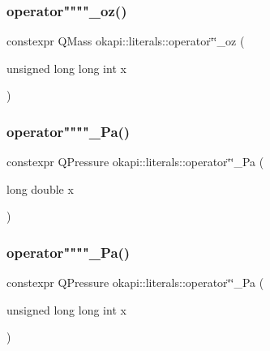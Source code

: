 \mbox{\label{namespaceokapi_1_1literals_a080ca78fe17f0bfe78e0a9c1c152aee9}} 
\subsubsection{\texorpdfstring{operator""""\_oz()}{operator""\_oz()}\hspace{0.1cm}{\footnotesize\ttfamily [2/2]}}
{\footnotesize\ttfamily constexpr Q\+Mass okapi\+::literals\+::operator\char`\"{}\char`\"{}\+\_\+oz (\begin{DoxyParamCaption}\item[{unsigned long long int}]{x }\end{DoxyParamCaption})}

\mbox{\label{namespaceokapi_1_1literals_ab89337b3aebf1978915cf59c47690c2b}} 
\subsubsection{\texorpdfstring{operator""""\_Pa()}{operator""\_Pa()}\hspace{0.1cm}{\footnotesize\ttfamily [1/2]}}
{\footnotesize\ttfamily constexpr Q\+Pressure okapi\+::literals\+::operator\char`\"{}\char`\"{}\+\_\+\+Pa (\begin{DoxyParamCaption}\item[{long double}]{x }\end{DoxyParamCaption})}

\mbox{\label{namespaceokapi_1_1literals_a7e08cc5723b3fa603130a1c7a48adca5}} 
\subsubsection{\texorpdfstring{operator""""\_Pa()}{operator""\_Pa()}\hspace{0.1cm}{\footnotesize\ttfamily [2/2]}}
{\footnotesize\ttfamily constexpr Q\+Pressure okapi\+::literals\+::operator\char`\"{}\char`\"{}\+\_\+\+Pa (\begin{DoxyParamCaption}\item[{unsigned long long int}]{x }\end{DoxyParamCaption})}

